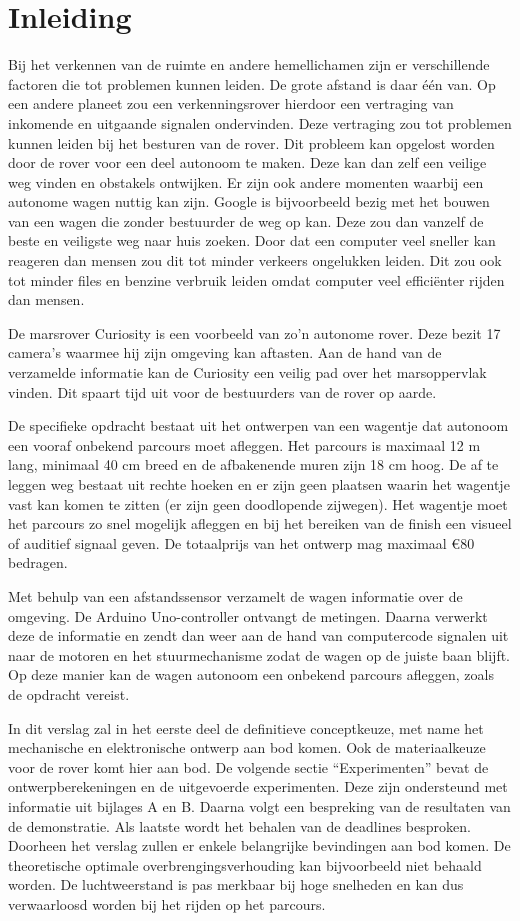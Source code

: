  
\section{Inleiding}
Bij het verkennen van de ruimte en andere hemellichamen zijn er verschillende 
factoren die tot problemen kunnen leiden. De grote afstand is daar één van. Op 
een andere planeet zou een verkenningsrover hierdoor een vertraging van 
inkomende en uitgaande signalen ondervinden. Deze vertraging zou tot problemen 
kunnen leiden bij het besturen van de rover. Dit probleem kan opgelost worden 
door de rover voor een deel autonoom te maken. Deze kan dan zelf een veilige weg 
vinden en obstakels ontwijken. Er zijn ook andere momenten waarbij een autonome 
wagen nuttig kan zijn. Google is bijvoorbeeld bezig met het bouwen van een wagen 
die zonder bestuurder de weg op kan. Deze zou dan vanzelf de beste en veiligste 
weg naar huis zoeken. Door dat een computer veel sneller kan reageren dan mensen
zou dit tot minder verkeers ongelukken leiden. Dit zou ook tot minder files en benzine
verbruik leiden omdat computer veel efficiënter rijden dan mensen. \cite{Googlecar}

De marsrover Curiosity is een voorbeeld van zo’n autonome rover. Deze bezit 17 
camera's waarmee hij zijn omgeving kan aftasten. Aan de hand van de verzamelde 
informatie kan de Curiosity een veilig pad over het marsoppervlak vinden. Dit 
spaart tijd uit voor de bestuurders van de rover op aarde.\cite{NASACuriosity, 
NASA2013-259} 

De specifieke opdracht bestaat uit het ontwerpen van een wagentje dat autonoom 
een vooraf onbekend parcours moet afleggen. Het parcours is maximaal 12 m lang, 
minimaal 40 cm breed en de afbakenende muren zijn 18 cm hoog. De af te leggen 
weg bestaat uit rechte hoeken en er zijn geen plaatsen waarin het wagentje vast 
kan komen te zitten (er zijn geen doodlopende zijwegen). Het wagentje moet het 
parcours zo snel mogelijk afleggen en bij het bereiken van de finish een visueel 
of auditief signaal geven. De totaalprijs van het ontwerp mag maximaal \euro 80 
bedragen.

Met behulp van een afstandssensor verzamelt de wagen informatie over de 
omgeving. De Arduino Uno-controller ontvangt de metingen. Daarna verwerkt deze  
de informatie en zendt dan weer aan de hand van computercode signalen uit naar 
de motoren en het stuurmechanisme zodat de wagen op de juiste baan blijft. Op 
deze manier kan de wagen autonoom een onbekend parcours afleggen, zoals 
de opdracht vereist.

In dit verslag zal in het eerste deel de definitieve conceptkeuze, met name het 
mechanische en elektronische ontwerp aan bod komen. Ook de materiaalkeuze voor 
de rover komt hier aan bod. De volgende sectie “Experimenten” bevat de 
ontwerpberekeningen en de uitgevoerde experimenten. Deze zijn ondersteund met 
informatie uit bijlages A en B. Daarna volgt een bespreking van de resultaten 
van de demonstratie. Als laatste wordt het behalen van de deadlines besproken.
Doorheen het verslag zullen er enkele belangrijke bevindingen aan bod komen. De 
theoretische optimale overbrengingsverhouding kan bijvoorbeeld niet behaald 
worden. De luchtweerstand is pas merkbaar bij hoge snelheden en kan dus 
verwaarloosd worden bij het rijden op het parcours.  
